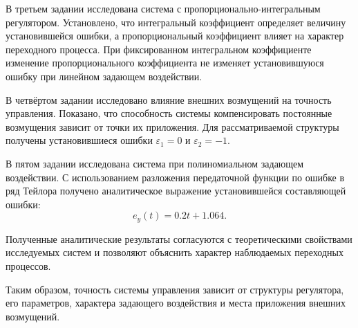 \documentclass[12pt, a4paper]{article}
\begin{document}
В третьем задании исследована система
с пропорционально-интегральным регулятором.
Установлено, что интегральный коэффициент
определяет величину установившейся ошибки,
а пропорциональный коэффициент влияет
на характер переходного процесса.
При фиксированном интегральном
коэффициенте изменение пропорционального
коэффициента не изменяет установившуюся
ошибку при линейном задающем воздействии.

В четвёртом задании исследовано влияние
внешних возмущений на точность управления.
Показано, что способность системы
компенсировать постоянные возмущения
зависит от точки их приложения.
Для рассматриваемой структуры
получены установившиеся ошибки
$\varepsilon_1=0$ и $\varepsilon_2=-1$.

В пятом задании исследована система
при полиномиальном задающем воздействии.
С использованием разложения передаточной
функции по ошибке в ряд Тейлора
получено аналитическое выражение
установившейся составляющей ошибки:
\[
    e_y(t)=0.2t+1.064.
\]

Полученные аналитические результаты
согласуются с теоретическими свойствами
исследуемых систем и позволяют объяснить
характер наблюдаемых переходных процессов.

Таким образом, точность системы управления
зависит от структуры регулятора,
его параметров, характера задающего
воздействия и места приложения
внешних возмущений.
\end{document}
